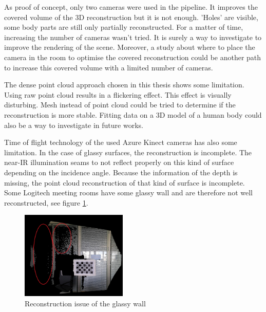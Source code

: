 As proof of concept, only two cameras were used in the pipeline. It improves the covered volume of the 3D reconstruction but it is not enough. 'Holes' are visible, some body parts are still only partially reconstructed. For a matter of time, increasing the number of cameras wasn't tried. It is surely a way to investigate to improve the rendering of the scene. Moreover, a study about where to place the camera in the room to optimise the covered reconstruction could be another path to increase this covered volume with a limited number of cameras.

The dense point cloud approach chosen in this thesis shows some limitation. Using raw point cloud results in a flickering effect. This effect is visually disturbing. Mesh instead of point cloud could be tried to determine if the reconstruction is more stable. Fitting data on a 3D model of a human body could also be a way to investigate in future works.

Time of flight technology of the used Azure Kinect cameras has also some limitation. In the case of glassy surfaces, the reconstruction is incomplete. The near-IR illumination seams to not reflect properly on this kind of surface depending on the incidence angle. Because the information of the depth is missing, the point cloud reconstruction of that kind of surface is incomplete. Some Logitech meeting rooms have some glassy wall and are therefore not well reconstructed, see figure \ref{figure:glass_wall_issue_red}. 

\begin{figure}[H]
    \centering
    \includegraphics[width=0.45\textwidth]{images/general_result/glass_wall_issue_red.png}
    \caption{Reconstruction issue of the glassy wall}
    \label{figure:glass_wall_issue_red}
\end{figure}










